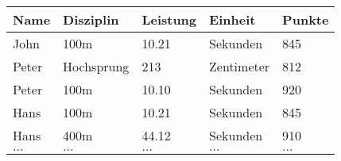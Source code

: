 \documentclass{lehramt-informatik-aufgabe}
\begin{document}
\begin{center}
\begin{tabular}{|l|l|l|l|l|}
\hline
Name    & Disziplin  & Leistung & Einheit    & Punkte \\\hline
John    & 100m       & 10.21    & Sekunden   & 845 \\
Peter   & Hochsprung & 213      & Zentimeter & 812 \\
Peter   & 100m       & 10.10    & Sekunden   & 920 \\
Hans    & 100m       & 10.21    & Sekunden   & 845 \\
Hans    & 400m       & 44.12    & Sekunden   & 910 \\
$\dots$ & $\dots$    & $\dots$  & $\dots$    & $\dots$ \\
\end{tabular}
\end{center}
\end{document}
